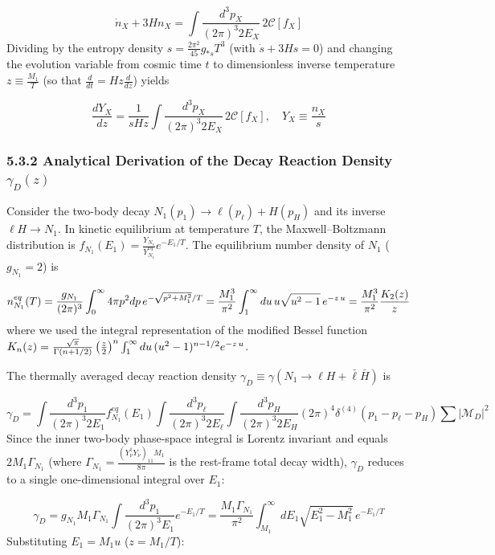 \documentclass[aps,prd,onecolumn,superscriptaddress,nofootinbib,longbibliography,10pt]{revtex4-2}
\begin{document}
  \[ \dot{n}_X + 3Hn_X = \int\frac{d^3p_X}{(2\pi)^3 2E_X}\,2\mathcal{C}[f_X] \]
  Dividing by the entropy density \(s = \frac{2\pi^2}{45}g_{*s}T^3\) (with \(\dot{s} + 3Hs = 0\)) and changing the evolution variable from cosmic time \(t\) to dimensionless inverse temperature \(z \equiv \frac{M_1}{T}\) (so that \(\frac{d}{dt} = Hz\frac{d}{dz}\)) yields


  \[ \frac{dY_X}{dz} = \frac{1}{sHz}\int\frac{d^3p_X}{(2\pi)^3 2E_X}\,2\mathcal{C}[f_X], \quad Y_X \equiv \frac{n_X}{s} \]

  
\subsubsection*{5.3.2 Analytical Derivation of the Decay Reaction Density \(\gamma_D(z)\)}

  Consider the two-body decay \(N_1(p_1) \to \ell(p_\ell) + H(p_H)\) and its inverse \(\ell H \to N_1\). In kinetic equilibrium at temperature \(T\), the Maxwell–Boltzmann distribution is \(f_{N_1}(E_1) = \frac{Y_{N_1}}{Y_{N_1}^{eq}}e^{-E_1/T}\). The equilibrium number density of \(N_1\) (\(g_{N_1} = 2\)) is


  \[ n_{N_1}^{eq}(T) = \frac{g_{N_1}}{(2\pi)^3}\int_0^\infty 4\pi p^2 dp\,e^{-\sqrt{p^2+M_1^2}/T} = \frac{M_1^3}{\pi^2}\int_1^\infty du\,u\sqrt{u^2 - 1} \, e^{{\small -z\,u}} = \frac{M_1^3}{\pi^2} \frac{K_2(z)}{z} \]
  where we used the integral representation of the modified Bessel function \(K_n(z) = \frac{\sqrt{\pi}}{\Gamma(n+1/2)}\left(\frac{z}{2}\right)^n\int_1^\infty du\,(u^2 - 1)^{n-1/2}e^{{\small -z\,u}}\).


  The thermally averaged decay reaction density \(\gamma_D \equiv \gamma(N_1 \to \ell H + \bar{\ell}\bar{H})\) is


  \[ \gamma_D = \int\frac{d^3p_1}{(2\pi)^3 2E_1}f_{N_1}^{eq}(E_1)\int\frac{d^3p_\ell}{(2\pi)^3 2E_\ell}\int\frac{d^3p_H}{(2\pi)^3 2E_H}(2\pi)^4\delta^{(4)}(p_1 - p_\ell - p_H)\sum|\mathcal{M}_D|^2 \]
  Since the inner two-body phase-space integral is Lorentz invariant and equals \(2M_1\Gamma_{N_1}\) (where \(\Gamma_{N_1} = \frac{(Y_\nu^\dagger Y_\nu)_{11}M_1}{8\pi}\) is the rest-frame total decay width), \(\gamma_D\) reduces to a single one-dimensional integral over \(E_1\):


  \[ \gamma_D = g_{N_1}M_1\Gamma_{N_1}\int\frac{d^3p_1}{(2\pi)^3 E_1}e^{-E_1/T} = \frac{M_1\Gamma_{N_1}}{\pi^2}\int_{M_1}^\infty dE_1\sqrt{E_1^2 - M_1^2}\,e^{-E_1/T} \]
  Substituting \(E_1 = M_1 u\) (\(z = M_1/T\)):
\end{document}
